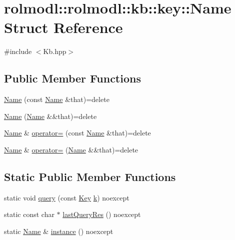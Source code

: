 \hypertarget{structrolmodl_1_1rolmodl_1_1kb_1_1key_1_1_name}{}\section{rolmodl\+::rolmodl\+::kb\+::key\+::Name Struct Reference}
\label{structrolmodl_1_1rolmodl_1_1kb_1_1key_1_1_name}


{\ttfamily \#include $<$Kb.\+hpp$>$}

\subsection*{Public Member Functions}
\begin{DoxyCompactItemize}
\item 
\mbox{\hyperlink{structrolmodl_1_1rolmodl_1_1kb_1_1key_1_1_name_a7811719d33231a58b4f5c690c213a5f6}{Name}} (const \mbox{\hyperlink{structrolmodl_1_1rolmodl_1_1kb_1_1key_1_1_name}{Name}} \&that)=delete
\item 
\mbox{\hyperlink{structrolmodl_1_1rolmodl_1_1kb_1_1key_1_1_name_a1821e19c6e10dc3645bad07e7bf54a6b}{Name}} (\mbox{\hyperlink{structrolmodl_1_1rolmodl_1_1kb_1_1key_1_1_name}{Name}} \&\&that)=delete
\item 
\mbox{\hyperlink{structrolmodl_1_1rolmodl_1_1kb_1_1key_1_1_name}{Name}} \& \mbox{\hyperlink{structrolmodl_1_1rolmodl_1_1kb_1_1key_1_1_name_a0037fffe278451fcd01e878276b66e1f}{operator=}} (const \mbox{\hyperlink{structrolmodl_1_1rolmodl_1_1kb_1_1key_1_1_name}{Name}} \&that)=delete
\item 
\mbox{\hyperlink{structrolmodl_1_1rolmodl_1_1kb_1_1key_1_1_name}{Name}} \& \mbox{\hyperlink{structrolmodl_1_1rolmodl_1_1kb_1_1key_1_1_name_af337806e2a0801749f5e9dee80021320}{operator=}} (\mbox{\hyperlink{structrolmodl_1_1rolmodl_1_1kb_1_1key_1_1_name}{Name}} \&\&that)=delete
\end{DoxyCompactItemize}
\subsection*{Static Public Member Functions}
\begin{DoxyCompactItemize}
\item 
static void \mbox{\hyperlink{structrolmodl_1_1rolmodl_1_1kb_1_1key_1_1_name_a0fb871693550e5d51a67980a49d4568f}{query}} (const \mbox{\hyperlink{namespacerolmodl_1_1rolmodl_1_1kb_a188e00b289aeb95ae45fb6bf2923e7e2}{Key}} \mbox{\hyperlink{namespacerolmodl_1_1rolmodl_1_1kb_1_1key_af2e2c19a7e4c7347383cae496d850490a8ce4b16b22b58894aa86c421e8759df3}{k}}) noexcept
\item 
static const char $\ast$ \mbox{\hyperlink{structrolmodl_1_1rolmodl_1_1kb_1_1key_1_1_name_a0a9994f42252bdfaafdb85a3e03c17bf}{last\+Query\+Res}} () noexcept
\item 
static \mbox{\hyperlink{structrolmodl_1_1rolmodl_1_1kb_1_1key_1_1_name}{Name}} \& \mbox{\hyperlink{structrolmodl_1_1rolmodl_1_1kb_1_1key_1_1_name_af0430a7156205c04825bb5a1011effda}{instance}} () noexcept
\end{DoxyCompactItemize}


